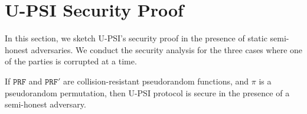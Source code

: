 \section{U-PSI Security Proof}\label{U-PSIProof}

In this section, we  sketch U-PSI's security proof  in the presence of static semi-honest adversaries. We conduct the security analysis for the three cases where one of the parties is corrupted at a time. 
\begin{theorem}
If $\mathtt{PRF}$ and $\mathtt{PRF}'$ are collision-resistant pseudorandom functions, and $\pi$ is a pseudorandom permutation, then U-PSI protocol is secure in the presence of a semi-honest adversary. 
\end{theorem}

\vspace{-2mm}


